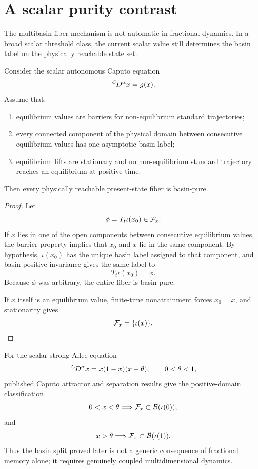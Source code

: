 \section{A scalar purity contrast}
\label{sec:scalar-purity}

The multibasin-fiber mechanism is not automatic in fractional dynamics. In a broad scalar threshold class, the current scalar value still determines the basin label on the physically reachable state set.

\begin{theorem}
\label{thm:scalar-purity}
Consider the scalar autonomous Caputo equation
\[
  \,{}^{C}\!D^{\alpha} x=g(x).
\]
Assume that:
\begin{enumerate}[label=(S\arabic*)]
  \item equilibrium values are barriers for non-equilibrium standard trajectories;
  \item every connected component of the physical domain between consecutive equilibrium values has one asymptotic basin label;
  \item equilibrium lifts are stationary and no non-equilibrium standard trajectory reaches an equilibrium at positive time.
\end{enumerate}
Then every physically reachable present-state fiber is basin-pure.
\end{theorem}

\begin{proof}
Let
\[
  \phi=T_t\iota(x_0)\in\mathcal{F}_{x}.
\]
If \(x\) lies in one of the open components between consecutive equilibrium values, the barrier property implies that \(x_0\) and \(x\) lie in the same component. By hypothesis, \(\iota(x_0)\) has the unique basin label assigned to that component, and basin positive invariance gives the same label to
\[
  T_t\iota(x_0)=\phi.
\]
Because \(\phi\) was arbitrary, the entire fiber is basin-pure.

If \(x\) itself is an equilibrium value, finite-time nonattainment forces \(x_0=x\), and stationarity gives
\[
  \mathcal{F}_{x}=\{\iota(x)\}.
\]
\end{proof}

For the scalar strong-Allee equation
\begin{equation}
  \,{}^{C}\!D^{\alpha} x=x(1-x)(x-\theta),
  \qquad
  0<\theta<1,
  \label{eq:scalar-allee}
\end{equation}
published Caputo attractor and separation results
\cite{AreaNieto2023AlleeCaputo,DoanKloeden2022Attractors,CongTuan2017}
give the positive-domain classification
\[
  0<x<\theta
  \Longrightarrow
  \mathcal{F}_{x}\subset\mathcal{B}(\iota(0)),
\]
and
\[
  x>\theta
  \Longrightarrow
  \mathcal{F}_{x}\subset\mathcal{B}(\iota(1)).
\]
Thus the basin split proved later is not a generic consequence of fractional memory alone; it requires genuinely coupled multidimensional dynamics.
